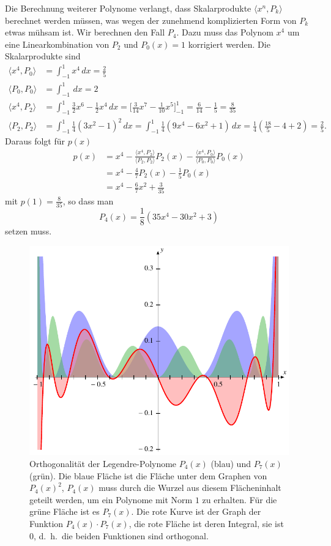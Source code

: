 Die Berechnung weiterer Polynome verlangt, dass Skalarprodukte
$\langle x^n,P_k\rangle$ berechnet werden müssen, was wegen
der zunehmend komplizierten Form von $P_k$ etwas mühsam ist.
Wir berechnen den Fall $P_4$.
Dazu muss das Polynom $x^4$ um eine Linearkombination von
$P_2$ und $P_0(x)=1$ korrigiert werden.
Die Skalarprodukte sind
\begin{align*}
\langle x^4, P_0\rangle
&=
\int_{-1}^1 x^4\,dx = \frac25
\\
\langle P_0,P_0\rangle
&=
\int_{-1}^1 \,dx = 2
\\
\langle x^4,P_2\rangle
&=
\int_{-1}^1 \frac32x^6-\frac12 x^4\,dx
=
\biggl[\frac{3}{14}x^7-\frac{1}{10}x^5\biggr]_{-1}^1
=
\frac6{14}-\frac15
=
\frac8{35}
\\
\langle P_2,P_2\rangle
&=
\int_{-1}^1 \frac14(3x^2-1)^2\,dx
=
\int_{-1}^1 \frac14(9x^4-6x^2+1)\,dx
=
\frac14(\frac{18}{5}-4+2)
=\frac25.
\end{align*}
Daraus folgt für $p(x)$
\begin{align*}
p(x)
&=
x^4
-
\frac{\langle x^4,P_2\rangle}{\langle P_2,P_2\rangle}P_2(x)
-
\frac{\langle x^4,P_0\rangle}{\langle P_0,P_0\rangle}P_0(x)
\\
&=
x^4
-\frac47 P_2(x) - \frac15 P_0(x)
\\
&=
x^4 - \frac{6}{7}x^2 + \frac{3}{35}
\end{align*}
mit $p(1)=\frac{8}{35}$, so dass man
\[
P_4(x) =
\frac18(35x^4-30x^2+3)
\]
setzen muss.

\begin{figure}
\centering
\includegraphics{chapters/070-orthogonalitaet/images/orthogonal.pdf}
\caption{Orthogonalität der Legendre-Polynome $P_4(x)$ ({\color{blue}blau})
und $P_7(x)$ ({\color{darkgreen}grün}).
Die blaue Fläche ist die Fläche unter dem Graphen 
von $P_4(x)^2$, $P_4(x)$ muss durch die Wurzel aus diesem Flächeninhalt
geteilt werden, um ein Polynome mit Norm $1$ zu erhalten.
Für die grüne Fläche ist es $P_7(x)$.
Die rote Kurve ist der Graph der Funktion $P_4(x)\cdot P_7(x)$,
die rote Fläche ist deren Integral, sie ist $0$, d.~h.~die beiden
Funktionen sind orthogonal.
\label{buch:integral:orthogonal:legendreortho}}
\end{figure}

